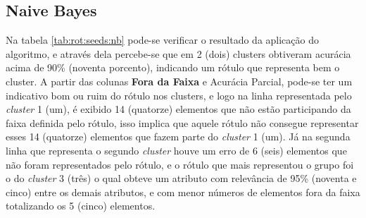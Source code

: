 

\subsection{Naive Bayes} \label{cap:resultados:ssec:seed:nb}



Na tabela \ref{tab:rot:seeds:nb} pode-se verificar o resultado da aplicação do algoritmo, e através dela percebe-se que em 2 (dois) clusters obtiveram acurácia acima de 90\% (noventa porcento), indicando um rótulo que representa bem o cluster. A partir das colunas  \textbf{Fora da Faixa} e Acurácia Parcial, pode-se ter um indicativo bom ou ruim do rótulo nos clusters, e  logo na linha representada pelo \textit{cluster} 1 (um), é exibido 14 (quatorze) elementos que não estão participando da faixa definida pelo rótulo, isso implica que aquele rótulo não consegue representar esses 14 (quatorze) elementos que fazem parte do \textit{cluster} 1 (um). Já na segunda linha que representa o segundo \textit{cluster} houve um erro de 6 (seis) elementos que não foram representados pelo rótulo, e o rótulo que mais representou o grupo foi o do \textit{cluster} 3 (três) o qual obteve um atributo com relevância de 95\% (noventa e cinco) entre os demais atributos, e com menor números de elementos fora da faixa totalizando os 5 (cinco) elementos. %


